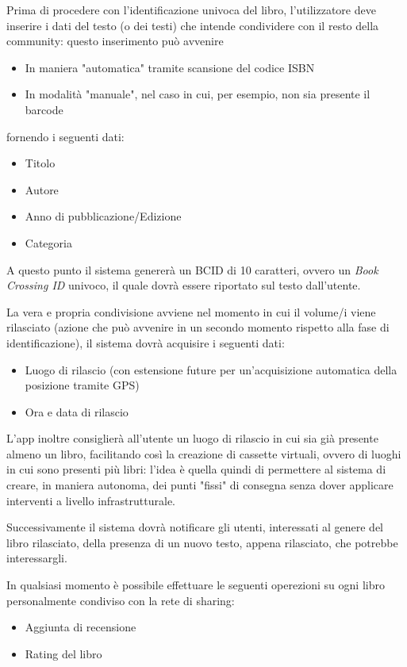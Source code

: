 Prima di procedere con l'identificazione univoca del libro, l'utilizzatore deve inserire i dati 
del testo (o dei testi) che intende condividere con il resto della community: questo inserimento può avvenire
\begin{itemize}
	\item In maniera "automatica" tramite scansione del codice ISBN
	\item In modalità "manuale", nel caso in cui, per esempio, non sia presente il barcode
\end{itemize}
fornendo i seguenti dati:
\begin{itemize}
	\item Titolo
	\item Autore
	\item Anno di pubblicazione/Edizione
	\item Categoria
\end{itemize}

A questo punto il sistema genererà un BCID di 10 caratteri, ovvero un \textit{Book Crossing ID} univoco, il
quale dovrà essere riportato sul testo dall'utente.


La vera e propria condivisione avviene nel momento in cui il volume/i viene rilasciato (azione che può avvenire in un secondo momento
rispetto alla fase di identificazione), il sistema dovrà acquisire i seguenti dati:
\begin{itemize}
	\item Luogo di rilascio (con estensione future per un'acquisizione automatica della posizione tramite GPS)
	\item Ora e data di rilascio 
\end{itemize}

L'app inoltre consiglierà all'utente un luogo di rilascio in cui sia già presente almeno un libro, 
facilitando così la creazione di cassette virtuali, ovvero di luoghi in cui sono presenti più libri: 
l'idea è quella quindi di permettere al sistema di creare, in maniera autonoma, dei punti "fissi" di 
consegna senza dover applicare interventi a livello infrastrutturale.

Successivamente il sistema dovrà notificare gli utenti, interessati al genere del 
libro rilasciato, della presenza di un nuovo testo, appena rilasciato, che potrebbe interessargli.

In qualsiasi momento è possibile effettuare le seguenti operezioni su ogni libro personalmente 
condiviso con la rete di sharing:
\begin{itemize}
	\item Aggiunta di recensione
	\item Rating del libro
\end{itemize}

